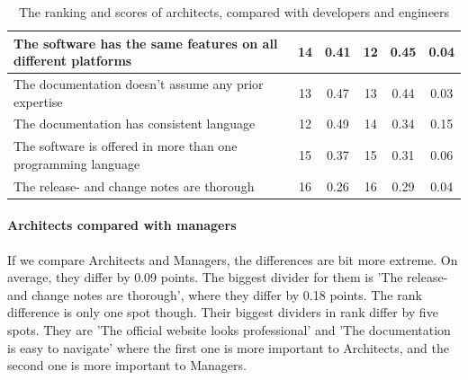 \documentclass{article}
\begin{document}
\begin{table}[H]
\begin{tabularx}{\columnwidth}{X|c:c|c:c|c}
The software has the same features on all different platforms         &        14 & 0.41             &              12 & 0.45             & 0.04  \\ \hline
The documentation doesn't assume any prior expertise                  &        13 & 0.47             &              13 & 0.44             & 0.03  \\ \hline
The documentation has consistent language                             &        12 & 0.49             &              14 & 0.34             & 0.15  \\ \hline
The software is offered in more than one programming language         &        15 & 0.37             &              15 & 0.31             & 0.06  \\ \hline
The release- and change notes are thorough                            &        16 & 0.26             &              16 & 0.29             & 0.04  \\ \hline
\end{tabularx}
\caption{The ranking and scores of architects, compared with developers and engineers}
\label{tab:arch-devs}
\end{table}

\paragraph{Architects compared with managers}

If we compare Architects and Managers, the differences are bit more
extreme. On average, they differ by 0.09 points. The biggest divider for
them is 'The release- and change notes are thorough', where they differ
by 0.18 points. The rank difference is only one spot though. Their
biggest dividers in rank differ by five spots. They are 'The official
website looks professional' and 'The documentation is easy to navigate'
where the first one is more important to Architects, and the second one
is more important to Managers.
\end{document}
